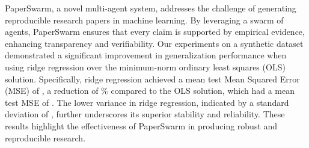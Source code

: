 PaperSwarm, a novel multi-agent system, addresses the challenge of generating reproducible research papers in machine learning. By leveraging a swarm of agents, PaperSwarm ensures that every claim is supported by empirical evidence, enhancing transparency and verifiability. Our experiments on a synthetic dataset demonstrated a significant improvement in generalization performance when using ridge regression over the minimum-norm ordinary least squares (OLS) solution. Specifically, ridge regression achieved a mean test Mean Squared Error (MSE) of , a reduction of \% compared to the OLS solution, which had a mean test MSE of . The lower variance in ridge regression, indicated by a standard deviation of , further underscores its superior stability and reliability. These results highlight the effectiveness of PaperSwarm in producing robust and reproducible research.
